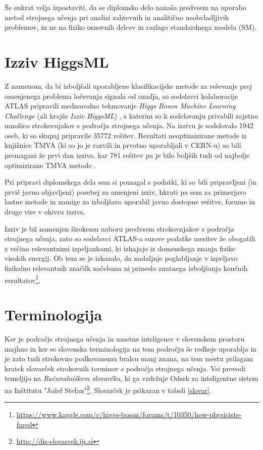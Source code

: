 \documentclass[11pt,a4paper,openany]{book}
\begin{document}
Še enkrat velja izpostaviti, da se diplomsko delo nanaša predvsem na uporabo metod strojnega učenja pri analizi zahtevnih in analitično neobvladljivih problemov, in ne na fiziko osnovnih delcev in razlago standardnega modela (SM).

\section*{Izziv HiggsML}
Z namenom, da bi izboljšali uporabljene klasifikacijske metode za reševanje prej omenjenega problema ločevanja signala od ozadja, so sodelavci kolaboracije ATLAS pripravili mednarodno tekmovanje \textit{Higgs Boson Machine Learning Challenge} (ali krajše \textit{Izziv HiggsML}) \cite{HiggsMLChallenge}, s katerim so k sodelovanju privabili zajetno množico strokovnjakov s področja strojnega učenja. Na izzivu je sodelovalo 1942 oseb, ki so skupaj pripravile 35772 rešitev. Rezultati neoptimizirane metode iz knjižnice TMVA (ki so jo je razvili in prvotno uporabljali v CERN-u) so bili premagani že prvi dan izziva, kar 781 rešitev pa je bilo boljših tudi od najbolje optimizirane TMVA metode \cite{Adam-Bourdarios14}.

Pri pripravi diplomskega dela sem si pomagal s podatki, ki so bili pripravljeni (in prvič javno objavljeni) posebej za omenjeni izziv, hkrati pa sem za primerjavo lastne metode in namige za izboljšavo uporabil javno dostopne rešitve, forume in druge vire v okivru izziva.

Izziv je bil namenjen širokemu naboru predvsem strokovnjakov s področja strojnega učenja, zato so sodelavci ATLAS-a surove podatke meritev že obogatili z večino relevantnimi izpeljankami, ki izhajajo iz domenskega znanja fizike visokih energij. Ob tem se je izkazalo, da nadaljnje poglabljanje v izpeljavo fizikalno relevantnih značilk načeloma ni prineslo znatnega izboljšanja končnih rezultatov\footnote{\url{https://www.kaggle.com/c/higgs-boson/forums/t/10350/how-physicists-fared}}.


\section*{Terminologija}

Ker je področje strojnega učenja in umetne inteligence v slovenskem prostoru majhno in ker se slovenska terminologija na tem področju še redkeje uporablja in je zato tudi strokovno podkovanemu bralcu manj znana, na tem mestu prilagam kratek slovarček strokovnih terminov s področja strojnega učenja. Vsi prevodi temeljijo na \textit{Računalniškem slovarčku}, ki ga vzdržuje Odsek za inteligentne sistem na Inštitutu "Jožef Stefan"\footnote{\url{http://dis-slovarcek.ijs.si}}. Slovarček je prikazan v tabeli \ref{slovar}.
\end{document}
